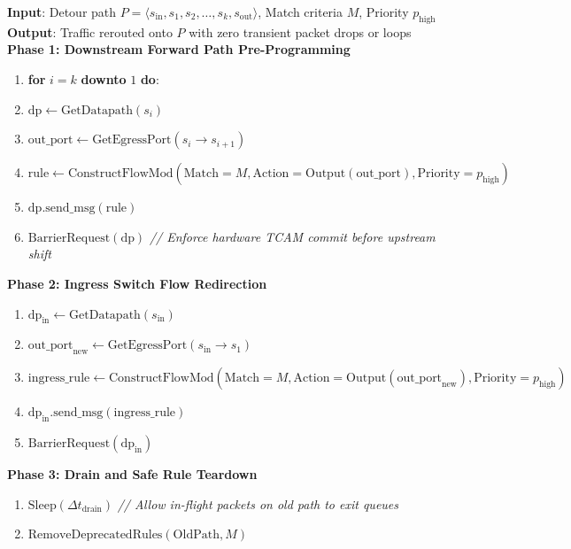 \begin{tcolorbox}[colback=codebg,colframe=sdnnavy!80,arc=3pt,title=\textbf{Algorithm 1: Make-Before-Break (MBB) Flow-Mod Installation Protocol}]
\label{alg:mbb_box}
\small\sffamily
\textbf{Input}: Detour path $P = \langle s_{\text{in}}, s_1, s_2, \dots, s_k, s_{\text{out}} \rangle$, Match criteria $M$, Priority $p_{\text{high}}$\\
\textbf{Output}: Traffic rerouted onto $P$ with zero transient packet drops or loops\\[0.2cm]
\textbf{Phase 1: Downstream Forward Path Pre-Programming}
\begin{enumerate}[leftmargin=1.5em,noitemsep]
  \item \textbf{for} $i = k$ \textbf{downto} $1$ \textbf{do}:
  \item \quad $\text{dp} \gets \text{GetDatapath}(s_i)$
  \item \quad $\text{out\_port} \gets \text{GetEgressPort}(s_i \to s_{i+1})$
  \item \quad $\text{rule} \gets \text{ConstructFlowMod}(\text{Match}=M, \text{Action}=\text{Output}(\text{out\_port}), \text{Priority}=p_{\text{high}})$
  \item \quad $\text{dp}.\text{send\_msg}(\text{rule})$
  \item \quad $\text{BarrierRequest}(\text{dp})$ \quad \textit{// Enforce hardware TCAM commit before upstream shift}
\end{enumerate}
\textbf{Phase 2: Ingress Switch Flow Redirection}
\begin{enumerate}[leftmargin=1.5em,noitemsep,resume]
  \item $\text{dp}_{\text{in}} \gets \text{GetDatapath}(s_{\text{in}})$
  \item $\text{out\_port}_{\text{new}} \gets \text{GetEgressPort}(s_{\text{in}} \to s_1)$
  \item $\text{ingress\_rule} \gets \text{ConstructFlowMod}(\text{Match}=M, \text{Action}=\text{Output}(\text{out\_port}_{\text{new}}), \text{Priority}=p_{\text{high}})$
  \item $\text{dp}_{\text{in}}.\text{send\_msg}(\text{ingress\_rule})$
  \item $\text{BarrierRequest}(\text{dp}_{\text{in}})$
\end{enumerate}
\textbf{Phase 3: Drain and Safe Rule Teardown}
\begin{enumerate}[leftmargin=1.5em,noitemsep,resume]
  \item $\text{Sleep}(\Delta t_{\text{drain}})$ \quad \textit{// Allow in-flight packets on old path to exit queues}
  \item $\text{RemoveDeprecatedRules}(\text{OldPath}, M)$
\end{enumerate}
\end{tcolorbox}

